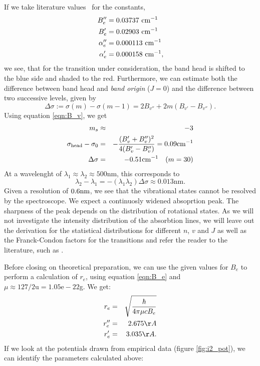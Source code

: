 If we take literature values~\cite{nist} for the constants, 
\begin{align}
    B_{e}'' &= 0.03737 \ \mathrm{cm^{-1}} \\ 
    B_{e}'  &= 0.02903 \ \mathrm{cm^{-1}} \\ 
    \alpha_{e}''  &= 0.000113 \ \mathrm{cm^{-1}} \\
    \alpha_{e}'  &= 0.000158 \ \mathrm{cm^{-1}},
\end{align}
we see, that for the transition under consideration, the band head is shifted 
to the blue side and shaded to the red. Furthermore, we can estimate both the 
difference between band head and \emph{band origin} 
($J = 0$) and the difference between two successive levels, given by
\begin{equation}
    \Delta \sigma := \sigma(m) - \sigma(m-1) = 2 B_{v''} +
    2m(B_{v'} - B_{v''}).
\end{equation}
Using equation \eqref{eqn:B_v}, we get
\begin{eqnarray}
    m_s &\approx& -3 \\
    \sigma_\mathrm{head} - \sigma_0 
        &=& - \frac{(B_v' + B_v'')^2}{4(B_v' - B_v'')} = 0.09 \mathrm{cm^{-1}} \\
    \Delta \sigma &=& -0.51 \mathrm{cm^{-1}} \quad (m = 30)
\end{eqnarray}
At a wavelenght of $\lambda_1 \approx \lambda_2 \approx 500\mathrm{nm}$, 
this corresponds to 
\begin{equation}
    \lambda_2 - \lambda_1 = -(\lambda_1 \lambda_2) \Delta \sigma \approx 0.013 \mathrm{nm}.
\end{equation}
Given a resolution of $0.6\mathrm{nm}$, we see that the vibrational states cannot be resolved 
by the spectroscope. We expect a continuosly widened absoprtion peak. The sharpness 
of the peak depends on the distribution of rotational states. As we will not investigate 
the intensity distribution of the absorbtion lines, we will leave out the derivation 
for the statistical distributions for different $n$, $v$ and $J$ as well as the 
Franck-Condon factors for the transitions and refer the reader to the literature, such 
as \cite{lefebvre2004spectra}. 

Before closing on theoretical preparation, we can use the given values for $B_e$ to 
perform a calculation of $r_e$, using equation \eqref{eqn:B_e} and 
$\mu \approx 127/2 \mathrm{u} = 1.05\mathrm{e}-22$g. We get:
\begin{eqnarray}
    r_e   &=& \sqrt{\frac{\hbar}{4 \pi \mu c B_e}} \label{eqn:r_e}\\
    r_e'' &=& 2.675 \AA \label{eqn:r_e0}\\
    r_e'  &=& 3.035 \AA. \label{eqn:r_e1}
\end{eqnarray}
If we look at the potentials drawn from empirical data (figure \ref{fig:i2_pot}), 
we can identify the parameters calculated above:

